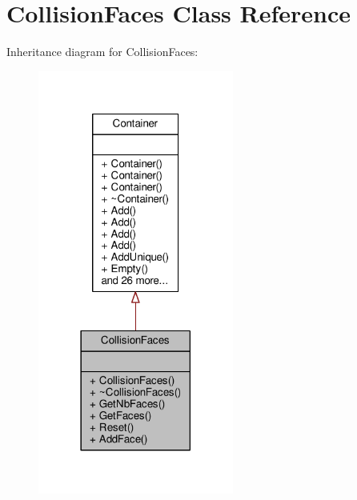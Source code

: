 \hypertarget{classCollisionFaces}{}\section{Collision\+Faces Class Reference}
\label{classCollisionFaces}


Inheritance diagram for Collision\+Faces\+:
\nopagebreak
\begin{figure}[H]
\begin{center}
\leavevmode
\includegraphics[width=182pt]{de/d15/classCollisionFaces__inherit__graph}
\end{center}
\end{figure}


